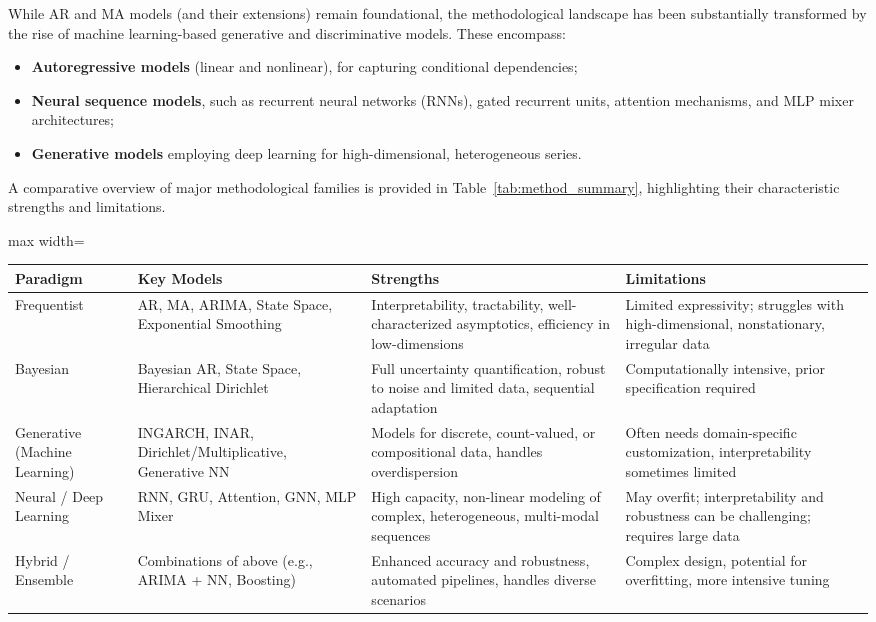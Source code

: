 While AR and MA models (and their extensions) remain foundational, the methodological landscape has been substantially transformed by the rise of machine learning-based generative and discriminative models. These encompass:
\begin{itemize}
    \item \textbf{Autoregressive models} (linear and nonlinear), for capturing conditional dependencies;
    \item \textbf{Neural sequence models}, such as recurrent neural networks (RNNs), gated recurrent units, attention mechanisms, and MLP mixer architectures;
    \item \textbf{Generative models} employing deep learning for high-dimensional, heterogeneous series.
\end{itemize}

A comparative overview of major methodological families is provided in Table~\ref{tab:method_summary}, highlighting their characteristic strengths and limitations.

\begin{table*}[htbp]
\centering
\caption{Comparison of principal modeling paradigms for sequential data}
\label{tab:method_summary}
\begin{adjustbox}{max width=\textwidth}
\begin{tabular}{llll}
\toprule
\textbf{Paradigm} & \textbf{Key Models} & \textbf{Strengths} & \textbf{Limitations} \\
\midrule
Frequentist & AR, MA, ARIMA, State Space, Exponential Smoothing & Interpretability, tractability, well-characterized asymptotics, efficiency in low-dimensions & Limited expressivity; struggles with high-dimensional, nonstationary, irregular data \\
Bayesian & Bayesian AR, State Space, Hierarchical Dirichlet & Full uncertainty quantification, robust to noise and limited data, sequential adaptation & Computationally intensive, prior specification required \\
Generative (Machine Learning) & INGARCH, INAR, Dirichlet/Multiplicative, Generative NN & Models for discrete, count-valued, or compositional data, handles overdispersion & Often needs domain-specific customization, interpretability sometimes limited \\
Neural / Deep Learning & RNN, GRU, Attention, GNN, MLP Mixer & High capacity, non-linear modeling of complex, heterogeneous, multi-modal sequences & May overfit; interpretability and robustness can be challenging; requires large data \\
Hybrid / Ensemble & Combinations of above (e.g., ARIMA + NN, Boosting) & Enhanced accuracy and robustness, automated pipelines, handles diverse scenarios & Complex design, potential for overfitting, more intensive tuning \\
\bottomrule
\end{tabular}
\end{adjustbox}
\end{table*}

